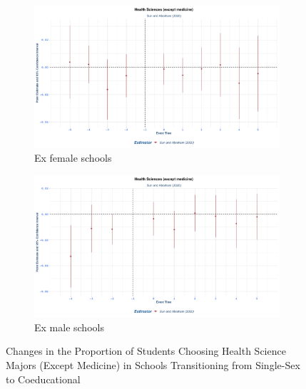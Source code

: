 \begin{figure}[H]
    \centering
    \begin{subfigure}[b]{0.45\textwidth}
        \centering
        \includegraphics[width=\textwidth]{Graph/Results/stagered_ex_females_HEALTH_SCIENCES.png}
        \caption{Ex female schools }
        \label{fig:staggered_females_health_sciences}
    \end{subfigure}
    \hfill
    \begin{subfigure}[b]{0.45\textwidth}
        \centering
        \includegraphics[width=\textwidth]{Graph/Results/stagered_ex_males_HEALTH_SCIENCES.png}
        \caption{Ex male schools}
        \label{fig:staggered_males_health_sciences}
    \end{subfigure}
       \caption{ Changes in the Proportion of Students Choosing Health Science Majors (Except Medicine) in Schools Transitioning from Single-Sex to Coeducational}
    \label{fig:staggered_health_sciences}
\end{figure}

